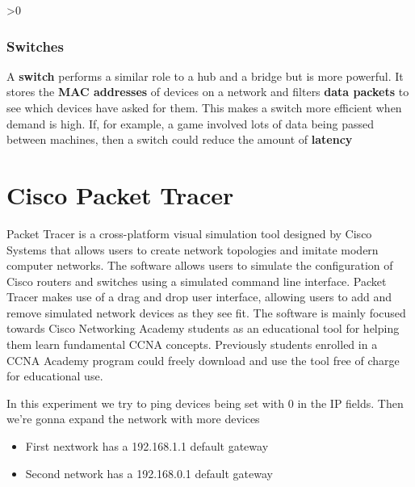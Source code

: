 \documentclass[a4paper,12pt]{book}
\makeatletter
\newcommand{\wrapfill}{\par\ifnum\value{WF@wrappedlines}>0
  \addtocounter{WF@wrappedlines}{-1}%
  \null\vspace{\arabic{WF@wrappedlines}\baselineskip}%
  \WFclear
\fi}
\makeatother
\begin{document}
\wrapfill
\clearpage

\subsubsection{Switches}
A \textbf{switch} performs a similar role to a hub and a bridge but is more powerful. It stores the \textbf{MAC addresses} of devices on a network and filters \textbf{data packets} to see which devices have asked for them. This makes a switch more efficient when demand is high. If, for example, a game involved lots of data being passed between machines, then a switch could reduce the amount of \textbf{latency}

\section{Cisco Packet Tracer}

Packet Tracer is a cross-platform visual simulation tool designed by Cisco Systems that allows users to create network topologies and imitate modern computer networks. The software allows users to simulate the configuration of Cisco routers and switches using a simulated command line interface. Packet Tracer makes use of a drag and drop user interface, allowing users to add and remove simulated network devices as they see fit. The software is mainly focused towards Cisco Networking Academy students as an educational tool for helping them learn fundamental CCNA concepts. Previously students enrolled in a CCNA Academy program could freely download and use the tool free of charge for educational use.\footnotemark{} \newline

In this experiment we try to ping devices being set with 0 in the IP fields. Then we're gonna expand the network with more devices


\begin{itemize}
\item{First nextwork has a 192.168.1.1 default gateway}
\item{Second network has a 192.168.0.1 default gateway}
\end{itemize}
\end{document}
